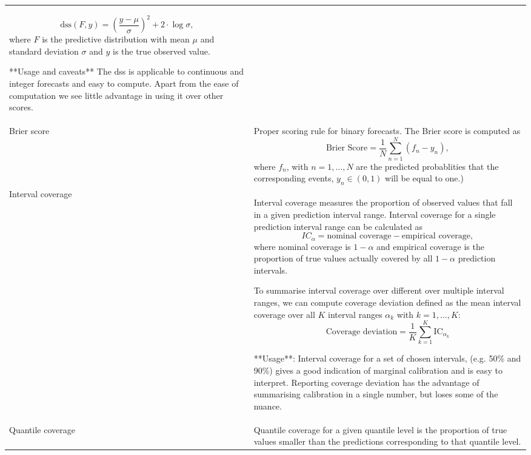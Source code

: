 \documentclass[
]{jss}
\begin{document}
\begin{CodeChunk}
\begin{longtable}[t]{>{\raggedright\arraybackslash}p{1.1in}>{\raggedright\arraybackslash}p{4.625in}}
  $$\text{dss}(F, y) = \left( \frac{y - \mu}{\sigma} \right)^2 + 2 \cdot \log \sigma,$$
  where $F$ is the predictive distribution with mean $\mu$ and standard deviation $\sigma$ and $y$ is the true observed value.

  **Usage and caveats** The dss is applicable to continuous and integer forecasts and easy to compute. Apart from the ease of computation we see little advantage in using it over other scores.\\
\addlinespace
Brier score & Proper scoring rule for binary forecasts. The Brier score is computed as
  $$\text{Brier Score} = \frac{1}{N} \sum_{n = 1}^{N} (f_n - y_n),$$
  where $f_n$, with $n = 1, \dots, N$ are the predicted probablities that the corresponding events, $y_n \in (0, 1)$ will be equal to one.)

\cellcolor{gray!6}{  **Usage**: Applicable to all binary forecasts.}\\
\addlinespace
Interval coverage & Interval coverage measures the proportion of observed values that fall in a given prediction interval range. Interval coverage for a single prediction interval range can be calculated as $$IC_{\alpha} = \text{nominal coverage} - \text{empirical coverage},$$
  where nominal coverage is $1 - \alpha$ and empirical coverage is the proportion of true values actually covered by all $1 - \alpha$ prediction intervals.

  To summarise interval coverage over different over multiple interval ranges, we can compute coverage deviation defined as the mean interval coverage over all $K$ interval ranges $\alpha_k$ with $k = 1, \dots, K$:
  $$\text{Coverage deviation} = \frac{1}{K} \sum_{k = 1}^{K} \text{IC}_{\alpha_k}$$

  **Usage**: Interval coverage for a set of chosen intervals, (e.g. 50\% and 90\%) gives a good indication of marginal calibration and is easy to interpret. Reporting coverage deviation has the advantage of summarising calibration in a single number, but loses some of the nuance.\\
\addlinespace
Quantile coverage & Quantile coverage for a given quantile level is the proportion of true values smaller than the predictions corresponding to that quantile level.


\end{longtable}
\end{CodeChunk}
\end{document}
